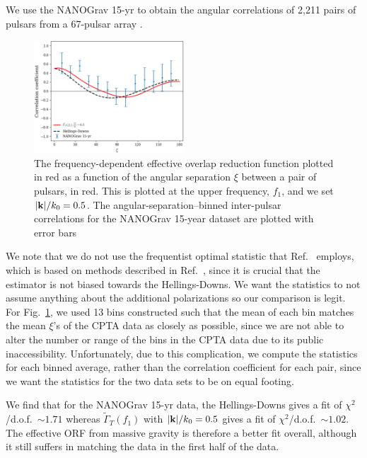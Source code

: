\documentclass[prd,aps,psfig,nofootinbib,nobibnotes,superscriptaddress,preprintnumbers,times]{revtex4-2}\setlength{\topmargin}{-14mm}
\begin{document}
We use the NANOGrav 15-yr to obtain the angular correlations of 2,211 pairs of pulsars from a 67-pulsar array \cite{Agazie:2023}. 
\begin{figure}[h]
    \centering
    \includegraphics[width=0.5\textwidth]{fig2.pdf}
    \caption{The frequency-dependent effective overlap reduction function plotted in red as a function of the angular separation $\xi$ between a pair of pulsars, in red. This is plotted at the upper frequency, $f_1$, and we set $|{\bf k}|/k_0 = 0.5$. The angular-separation–binned inter-pulsar correlations for the NANOGrav 15-year dataset are plotted with error bars}
    \label{fig:ng}
\end{figure}
We note that we do not use the frequentist optimal statistic that Ref.\ \cite{Agazie:2023} employs, which is based on methods described in Ref.\ \cite{Allen:2022ksj}, since it is crucial that the estimator is not biased towards the Hellings-Downs. We want the statistics to not assume anything about the additional polarizations so our comparison is legit. For Fig.\ \ref{fig:ng}, we used 13 bins constructed such that the mean of each bin matches the mean $\xi$'s of the CPTA data as closely as possible, since we are not able to alter the number or range of the bins in the CPTA data due to its public inaccessibility. Unfortunately, due to this complication, we compute the statistics for each binned average, rather than the correlation coefficient for each pair, since we want the statistics for the two data sets to be on equal footing. 

We find that for the NANOGrav 15-yr data, the Hellings-Downs gives a fit of $\chi^2$/d.o.f.\ $\sim 1.71$ whereas $\tilde{\Gamma}_T(f_1)$ with $|{\bf k}|/k_0 = 0.5$ gives a fit of $\chi^2$/d.o.f.\ $\sim 1.02$. The effective ORF from massive gravity is therefore a better fit overall, although it still suffers in matching the data in the first half of the data.
\end{document}
